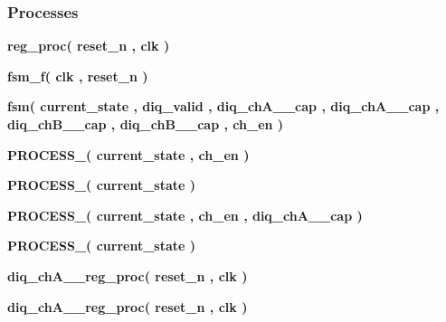 \subsubsection*{Processes}
 \begin{DoxyCompactItemize}
\item 
{\bf reg\+\_\+proc}{\bfseries  ( {\bfseries {\bfseries {\bf reset\+\_\+n}} \textcolor{vhdlchar}{ }} , {\bfseries {\bfseries {\bf clk}} \textcolor{vhdlchar}{ }} )}
\item 
{\bf fsm\+\_\+f}{\bfseries  ( {\bfseries {\bfseries {\bf clk}} \textcolor{vhdlchar}{ }} , {\bfseries {\bfseries {\bf reset\+\_\+n}} \textcolor{vhdlchar}{ }} )}
\item 
{\bf fsm}{\bfseries  ( {\bfseries {\bfseries {\bf current\+\_\+state}} \textcolor{vhdlchar}{ }} , {\bfseries {\bfseries {\bf diq\+\_\+valid}} \textcolor{vhdlchar}{ }} , {\bfseries {\bfseries {\bf diq\+\_\+ch\+A\+\_\+\_\+cap}} \textcolor{vhdlchar}{ }} , {\bfseries {\bfseries {\bf diq\+\_\+ch\+A\+\_\+\_\+cap}} \textcolor{vhdlchar}{ }} , {\bfseries {\bfseries {\bf diq\+\_\+ch\+B\+\_\+\_\+cap}} \textcolor{vhdlchar}{ }} , {\bfseries {\bfseries {\bf diq\+\_\+ch\+B\+\_\+\_\+cap}} \textcolor{vhdlchar}{ }} , {\bfseries {\bfseries {\bf ch\+\_\+en}} \textcolor{vhdlchar}{ }} )}
\item 
{\bf P\+R\+O\+C\+E\+S\+S\+\_}{\bfseries  ( {\bfseries {\bfseries {\bf current\+\_\+state}} \textcolor{vhdlchar}{ }} , {\bfseries {\bfseries {\bf ch\+\_\+en}} \textcolor{vhdlchar}{ }} )}
\item 
{\bf P\+R\+O\+C\+E\+S\+S\+\_}{\bfseries  ( {\bfseries {\bfseries {\bf current\+\_\+state}} \textcolor{vhdlchar}{ }} )}
\item 
{\bf P\+R\+O\+C\+E\+S\+S\+\_}{\bfseries  ( {\bfseries {\bfseries {\bf current\+\_\+state}} \textcolor{vhdlchar}{ }} , {\bfseries {\bfseries {\bf ch\+\_\+en}} \textcolor{vhdlchar}{ }} , {\bfseries {\bfseries {\bf diq\+\_\+ch\+A\+\_\+\_\+cap}} \textcolor{vhdlchar}{ }} )}
\item 
{\bf P\+R\+O\+C\+E\+S\+S\+\_}{\bfseries  ( {\bfseries {\bfseries {\bf current\+\_\+state}} \textcolor{vhdlchar}{ }} )}
\item 
{\bf diq\+\_\+ch\+A\+\_\+\_\+reg\+\_\+proc}{\bfseries  ( {\bfseries {\bfseries {\bf reset\+\_\+n}} \textcolor{vhdlchar}{ }} , {\bfseries {\bfseries {\bf clk}} \textcolor{vhdlchar}{ }} )}
\item 
{\bf diq\+\_\+ch\+A\+\_\+\_\+reg\+\_\+proc}{\bfseries  ( {\bfseries {\bfseries {\bf reset\+\_\+n}} \textcolor{vhdlchar}{ }} , {\bfseries {\bfseries {\bf clk}} \textcolor{vhdlchar}{ }} )}

\end{DoxyCompactItemize}
